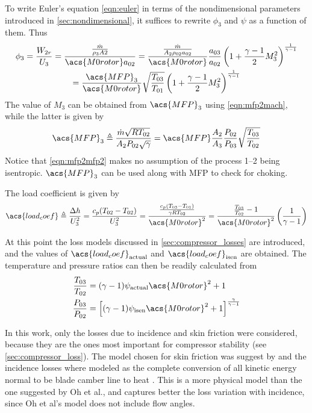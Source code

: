 \documentclass[tcc]{subfiles}
\begin{document}
To write Euler's equation \cref{eqn:euler} in terms of the nondimensional parameters introduced in \cref{sec:nondimensional}, it suffices to rewrite $\phi_3$ and $\psi$ as a function of them. Thus
\begin{multline}
    \label{eqn:phi2_dimensionless}
    \phi_3 = \frac{W_{2r}}{U_3} 
           = \frac{\frac{\dot{m}}{\rho_3 A2}}{\acs{M0rotor} a_{02}}
           = \frac{\MFPalt{2}}{\acs{M0rotor}} \frac{a_{03}}{a_{02}} \stagdensratio{3} \\ 
           = \frac{\acs{MFP}_3}{\acs{M0rotor}} \sqrt{\frac{T_{03}}{T_{01}}} \stagdensratio{3}
\end{multline}
The value of $M_3$ can be obtained from $\acs{MFP}_3$ using \cref{eqn:mfp2mach}, while the latter is given by
\begin{equation}
    \label{eqn:mfp2mfp2}
    \acs{MFP}_3 \triangleq \MFP{2} = \acs{MFP} \frac{A_2}{A_3} \frac{P_{02}}{P_{03}} \sqrt{\frac{T_{03}}{T_{02}}}
\end{equation}
Notice that \cref{eqn:mfp2mfp2} makes no assumption of the process 1--2 being isentropic. $\acs{MFP}_3$ can be used along with \acs{MFP} to check for choking.

The load coefficient is given by
\begin{equation}
    \acs{load_coef}\triangleq \frac{\Delta h}{U_3^2}
                      = \frac{c_p(T_{02}-T_{02})}{U_3^2}
                      = \frac{\frac{c_p(T_{03}-T_{01})}{\gamma R T_{02}}}
                                    {\acs{M0rotor}^2}
                      = \frac{\frac{T_{03}}{T_{02}}-1}
                                  {\acs{M0rotor}^2}
                        \left(\frac{1}{\gamma-1}\right)
\end{equation}

At this point the loss models discussed in \cref{sec:compressor_losses} are introduced, 
and the values of $\acs{load_coef}_{\text{actual}}$ and $\acs{load_coef}_{\text{isen}}$ are obtained.
The temperature and pressure ratios can then be readily calculated from
\begin{align}
    \label{eqn:psi2Tratio}
    \frac{T_{03}}{T_{02}} &= (\gamma - 1)\psi_{\text{actual}} \acs{M0rotor}^2 + 1 \\
    \label{eqn:psi2Pratio}
    \frac{P_{03}}{P_{02}} &= \left[(\gamma - 1)\psi_{\text{isen}} \acs{M0rotor}^2 + 1\right]^\frac{\gamma}{\gamma-1}
\end{align}

In this work, only the losses due to incidence and skin friction were considered, because they are the ones most important for compressor stability (see \cref{sec:compressor_loss}). The model chosen for skin friction was suggest by \textcite{Oh1997} and the incidence losses where modeled as the complete conversion of all kinetic energy normal to be blade camber line to heat \cite{Galvas1973}. This is a more physical model than the one suggested by Oh et al., and captures better the loss variation with incidence, since Oh et al's model does not include flow angles. 
\end{document}
